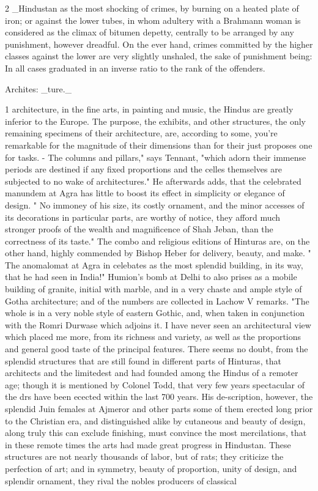 \documentclass[10pt]{article}
\begin{document}
\begin{multicols}{2}\raggedcolumns
\_Hindustan as the most shocking of crimes, by burning on a heated plate of iron; or against the lower tubes, in whom adultery with a Brahmann woman is considered as the climax of bitumen depetty, centrally to be arranged by any punishment, however dreadful. On the ever hand, crimes committed by the higher classes against the lower are very slightly unshaled, the sake of punishment being: In all cases graduated in an inverse ratio to the rank of the offenders.

Archites: \_ture.\_

1 architecture, in the fine arts, in painting and music, the Hindus are greatly inferior to the Europe. The purpose, the exhibits, and other structures, the only remaining specimens of their architecture, are, according to some, you’re remarkable for the magnitude of their dimensions than for their just proposes one for tasks. - The columns and pillars," says Tennant, "which adorn their immense periods are destined if any fixed proportions and the celles themselves are subjected to no wake of architectures." He afterwards adds, that the celebrated manundem at Agra has little to boost its effect in simplicity or elegance of design. " No immoney of his size, its costly ornament, and the minor accesses of its decorations in particular parts, are worthy of notice, they afford much stronger proofs of the wealth and magnificence of Shah Jeban, than the correctness of its taste." The combo and religious editions of Hinturas are, on the other hand, highly commended by Bishop Heber for delivery, beauty, and make. " The anomalomat at Agra in celebates as the most splendid building, in its way, that he had seen in India!" Humion's bomb at Delhi to also prises as a mobile building of granite, initial with marble, and in a very chaste and ample style of Gotha architecture; and of the numbers are collected in Lachow V remarks. "The whole is in a very noble style of eastern Gothic, and, when taken in conjunction with the Romri Durwase which adjoins it. I have never seen an architectural view which placed me more, from its richness and variety, as well as the proportions and general good taste of the principal features. There seems no doubt, from the splendid structures that are still found in different parts of Hinturas, that architects and the limitedest and had founded among the Hindus of a remoter age; though it is mentioned by Colonel Todd, that very few years spectacular of the drs have been ecected within the last 700 years. His de-scription, however, the splendid Juin females at Ajmeror and other parts some of them erected long prior to the Christian era, and distinguished alike by cutaneous and beauty of design, along truly this can exclude finishing, must convince the most mercilations, that in these remote times the arts had made great progress in Hindustan. These structures are not nearly thousands of labor, but of rats; they criticize the perfection of art; and in symmetry, beauty of proportion, unity of design, and splendir ornament, they rival the nobles producers of classical 
\end{multicols}
\end{document}
